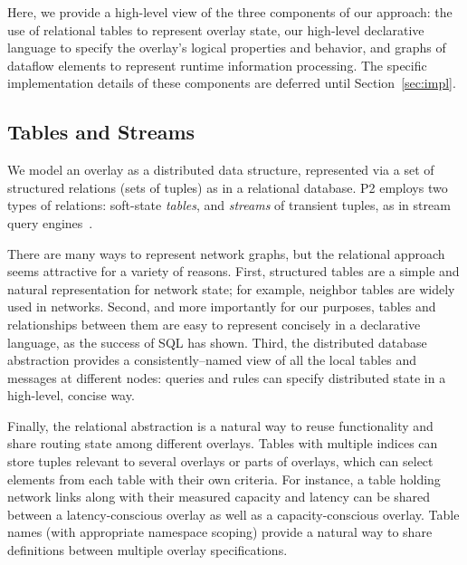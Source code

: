 \documentclass{sig-alt-full}
\def\Sys{P2\xspace}
\begin{document}
% 
Here, we provide a high-level view of the three components
of our approach: the use of relational tables to represent overlay
state, our high-level declarative language to specify the overlay's
logical properties and behavior, and graphs of dataflow elements to
represent runtime information processing.  The specific implementation
details of these components are deferred until Section~\ref{sec:impl}.


\subsection{Tables and Streams}

We model an overlay as a distributed data structure,
represented via a set of structured relations (sets of tuples)
as in a relational database.  \Sys employs two types
of relations: soft-state {\em tables}, and
{\em streams} of transient tuples, as in stream query
engines~\cite{aurora,telegraphcq,stream}.

There are many ways to represent network graphs, but the relational
approach seems attractive for a variety of reasons.  
First, structured tables are a simple and natural representation for
network state; for example, neighbor tables are widely used in
networks.
Second, and more importantly for our purposes, tables and
relationships between them are easy to represent concisely in a
declarative language, as the success of SQL has shown.
Third, the distributed database abstraction
provides a consistently--named view of all the 
local tables and messages at different nodes: queries and rules can
specify distributed state in a high-level, concise way.

Finally, the relational abstraction is a natural way to reuse
functionality and share routing state among different overlays.
Tables with multiple indices can store tuples relevant to several 
overlays or parts of overlays, which can select elements from each table with their own
criteria.  For instance, a table holding network links along with their
measured capacity and latency can be shared between a latency-conscious
overlay as well as a capacity-conscious overlay. Table names (with
appropriate namespace scoping) provide 
a natural way to share definitions between multiple overlay
specifications. 
\end{document}
